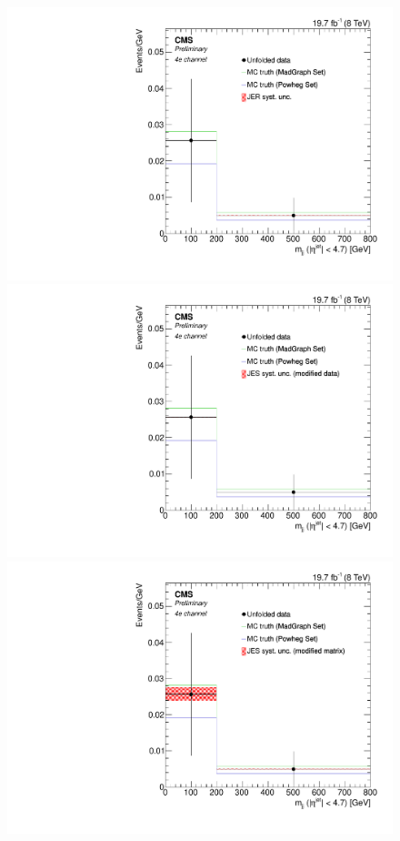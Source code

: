 \begin{figure}[hbtp]
\begin{center}
    \includegraphics[width=0.8\cmsFigWidth]{Figures/Unfolding/Systematics/ZZTo4e_Mjj_JER_Mad_fr}
    \includegraphics[width=0.8\cmsFigWidth]{Figures/Unfolding/Systematics/ZZTo4e_Mjj_JES_ModData_Mad_fr}     
    \includegraphics[width=0.8\cmsFigWidth]{Figures/Unfolding/Systematics/ZZTo4e_Mjj_JES_ModMat_Mad_fr}

\end{center}
\end{figure}
